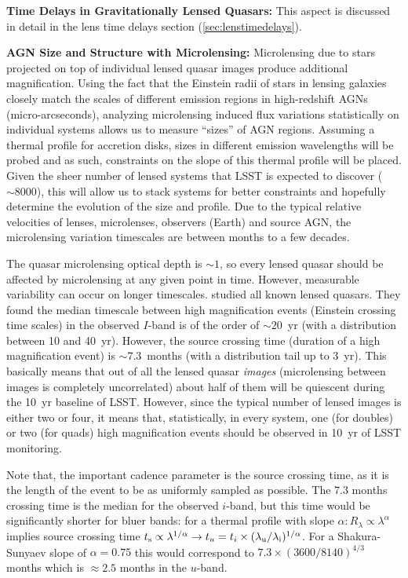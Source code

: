 {\bf Time Delays in Gravitationally Lensed Quasars:} This aspect is
discussed in detail in the lens time delays section
(\autoref{sec:lenstimedelays}).

{\bf AGN Size and Structure with Microlensing:} Microlensing due to
stars projected on top of individual lensed quasar images produce
additional magnification. Using the fact that the Einstein radii of
stars in lensing galaxies closely match the scales of different
emission regions in high-redshift AGNs (micro-arcseconds), analyzing
microlensing induced flux variations statistically on individual
systems allows us to measure ``sizes'' of AGN regions.
%
Assuming a thermal profile for accretion disks, sizes in different
emission wavelengths will be probed and as such, constraints on the
slope of this thermal profile will be placed. Given the sheer number
of lensed systems that LSST is expected to discover ($\sim8000$),
this will allow us to stack systems for better constraints and
hopefully determine the evolution of the size and profile. Due to the
typical relative velocities of lenses, microlenses, observers (Earth)
and source AGN, the microlensing variation timescales are between
months to a few decades.

The quasar microlensing optical depth is $\sim1$, so every lensed
quasar should be affected by microlensing at any given point in time.
However, measurable variability can occur on longer timescales.
\citet{MosqueraandKochanek2011} studied all known lensed quasars.
They found the median timescale between high magnification events
(Einstein crossing time scales) in the observed $I$-band is of the
order of $\sim20$~yr (with a distribution between 10 and 40~yr).
However, the source crossing time (duration of a high magnification
event) is $\sim7.3$~months (with a distribution tail up to 3~yr).
This basically means that out of all the lensed quasar {\em images}
(microlensing between images is completely uncorrelated) about half
of them will be quiescent during the 10~yr baseline of LSST. However,
since the typical number of lensed images is either two or four, it
means that, statistically, in every system, one (for doubles) or two
(for quads) high magnification events should be observed in 10~yr of
LSST monitoring.

Note that, the important cadence parameter is the source crossing time,
as it is the length of the event to be as uniformly sampled as
possible. The 7.3 months crossing time is the median for the observed
$i$-band, but this time would be significantly shorter for bluer bands:
for a thermal profile with slope
$\alpha: R_\lambda \propto \lambda^\alpha$ implies source crossing time
$t_{\rm s} \propto \lambda^{1/\alpha} \rightarrow
t_u=t_i \times (\lambda_{\rm u} / \lambda_{\rm i})^{1/\alpha}$. For a
Shakura-Sunyaev slope of $\alpha=0.75$ this would correspond to
$7.3 \times (3600/8140)^{4/3}$ months which is $\approx 2.5$ months in
the $u$-band.

